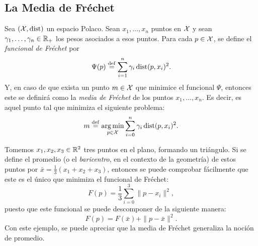 {{	  \subsection*{La Media de Fréchet}\label{ssec:la-media-de-Frechet}
	  {
		  \begin{definition}
			  Sea $(\mathcal{X}, \operatorname{dist})$ un espacio Polaco. Sean $x_1, \ldots, x_n$ puntos en $\mathcal{X}$ y sean $\gamma_1,\ldots,\gamma_n\in\mathbb{R}_+$ los pesos asociados a esos puntos. Para cada $p\in\mathcal{X}$, se define el \emph{funcional de Fréchet} por
			  \begin{equation}
				  \label{eq:funcionalFrechet}
				  \Psi(p) \stackrel{\mathrm{def}}{=} \sum_{i=1}^{n} \gamma_i \operatorname{dist}(p, x_i)^2.
			  \end{equation}
			  Y, en caso de que exista un punto $m \in \mathcal{X}$ que minimice el funcional $\Psi$, entonces este se definirá como la \emph{media de Fréchet} de los puntos $x_1,\ldots, x_n$. Es decir, es aquel punto tal que minimiza el siguiente problema:
			  \begin{equation}
				  \label{eq:mediaFrechet}
				  m \stackrel{\mathrm{def}}{=} \operatorname*{arg\,m{i}n}_{p \in \mathcal{X}} \sum_{i=0}^{n} \gamma_i \operatorname{dist}(p, x_i)^2.
			  \end{equation}
		  \end{definition}

		  \begin{example}\label{ex:baricentro-triangulo}
			  Tomemos $x_1, x_2, x_3 \in \mathbb{R}^2$ tres puntos en el plano, formando un triángulo. Si se define el promedio (o el \textit{baricentro}, en el contexto de la geometría) de estos puntos por $\bar x = \frac{1}{3} (x_1 + x_2 + x_3)$, entonces se puede comprobar fácilmente que este es el único que minimiza el funcional de Fréchet:
			  \begin{equation}
				  F(p) = \frac{1}{3} \sum_{i=0}^{3} \|p - x_i\|^2,
			  \end{equation}
			  puesto que este funcional se puede descomponer de la siguiente manera:
			  \begin{equation}
				  F(p) = F(\bar x) + \|p-\bar x\|^2.
			  \end{equation}
			  Con este ejemplo, se puede apreciar que la media de Fréchet generaliza la noción de promedio.
		  \end{example}

}}}
